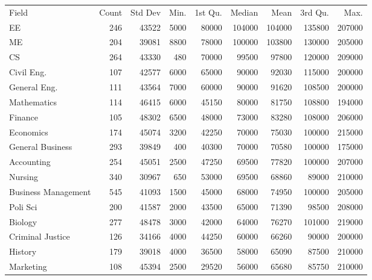 \documentclass{exam}
\begin{document}
  \begin{table}[ht]
    \centering
    \begin{tabular}{lrrrrrrrr}
      \toprule
      \midrule
      Field                & Count & Std Dev & Min. & 1st Qu. & Median & Mean   & 3rd Qu. & Max. \\
      EE                   & 246   & 43522   & 5000 & 80000   & 104000 & 104000 & 135800  & 207000 \\
      ME                   & 204   & 39081   & 8800 & 78000   & 100000 & 103800 & 130000  & 205000 \\
      CS                   & 264   & 43330   & 480  & 70000   & 99500  & 97800  & 120000  & 209000 \\
      Civil Eng.           & 107   & 42577   & 6000 & 65000   & 90000  & 92030  & 115000  & 200000 \\
      General Eng.         & 111   & 43564   & 7000 & 60000   & 90000  & 91620  & 108500  & 200000 \\
      Mathematics          & 114   & 46415   & 6000 & 45150   & 80000  & 81750  & 108800  & 194000 \\
      Finance              & 105   & 48302   & 6500 & 48000   & 73000  & 83280  & 108000  & 206000 \\
      Economics            & 174   & 45074   & 3200 & 42250   & 70000  & 75030  & 100000  & 215000 \\
      General Business     & 293   & 39849   & 400  & 40300   & 70000  & 70580  & 100000  & 175000 \\
      Accounting           & 254   & 45051   & 2500 & 47250   & 69500  & 77820  & 100000  & 207000 \\
      Nursing              & 340   & 30967   & 650  & 53000   & 69500  & 68860  & 89000   & 210000 \\
      Business Management  & 545   & 41093   & 1500 & 45000   & 68000  & 74950  & 100000  & 205000 \\
      Poli Sci             & 200   & 41587   & 2000 & 43500   & 65000  & 71390  & 98500   & 208000 \\
      Biology              & 277   & 48478   & 3000 & 42000   & 64000  & 76270  & 101000  & 219000 \\
      Criminal Justice     & 126   & 34166   & 4000 & 44250   & 60000  & 66260  & 90000   & 200000 \\
      History              & 179   & 39018   & 4000 & 36500   & 58000  & 65090  & 87500   & 210000 \\
      Marketing            & 108   & 45394   & 2500 & 29520   & 56000  & 65680  & 85750   & 210000 \\

\end{tabular}
\end{table}
\end{document}

